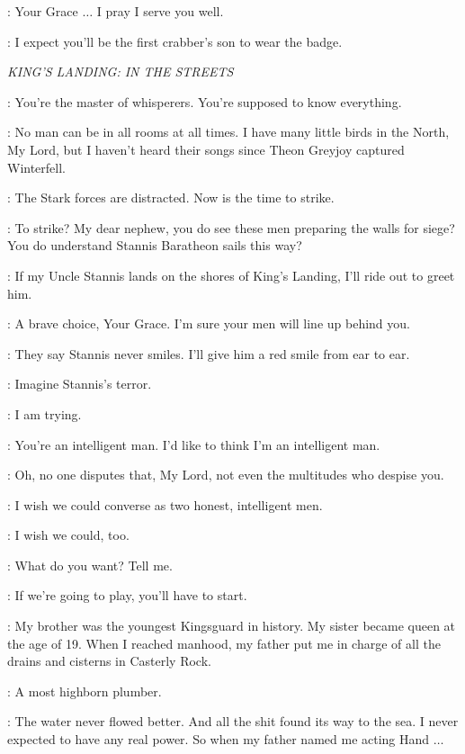 \DAVOS: Your Grace $\ldots$ I pray I serve you well. 

\STANNIS: I expect you'll be the first crabber's son to wear the badge. 


\scene

\textit{KING'S LANDING: IN THE STREETS} 


\JOFFREY: You're the master of whisperers. You're supposed to know everything. 

\VARYS: No man can be in all rooms at all times. I have many little birds in the North, My Lord, but I haven't heard their songs since Theon Greyjoy captured Winterfell. 

\JOFFREY: The Stark forces are distracted. Now is the time to strike. 

\TYRION: To strike? My dear nephew, you do see these men preparing the walls for siege? You do understand Stannis Baratheon sails this way? 

\JOFFREY: If my Uncle Stannis lands on the shores of King's Landing, I'll ride out to greet him. 

\TYRION: A brave choice, Your Grace. I'm sure your men will line up behind you. 

\JOFFREY: They say Stannis never smiles. I'll give him a red smile from ear to ear. 


\TYRION: Imagine Stannis's terror. 

\VARYS: I am trying. 

\TYRION: You're an intelligent man. I'd like to think I'm an intelligent man. 

\VARYS: Oh, no one disputes that, My Lord, not even the multitudes who despise you. 

\TYRION: I wish we could converse as two honest, intelligent men. 

\VARYS: I wish we could, too. 

\TYRION: What do you want? Tell me. 

\VARYS: If we're going to play, you'll have to start. 

\TYRION: My brother was the youngest Kingsguard in history. My sister became queen at the age of 19. When I reached manhood, my father put me in charge of all the drains and cisterns in Casterly Rock. 

\VARYS: A most highborn plumber. 

\TYRION: The water never flowed better. And all the shit found its way to the sea. I never expected to have any real power. So when my father named me acting Hand $\ldots$  

